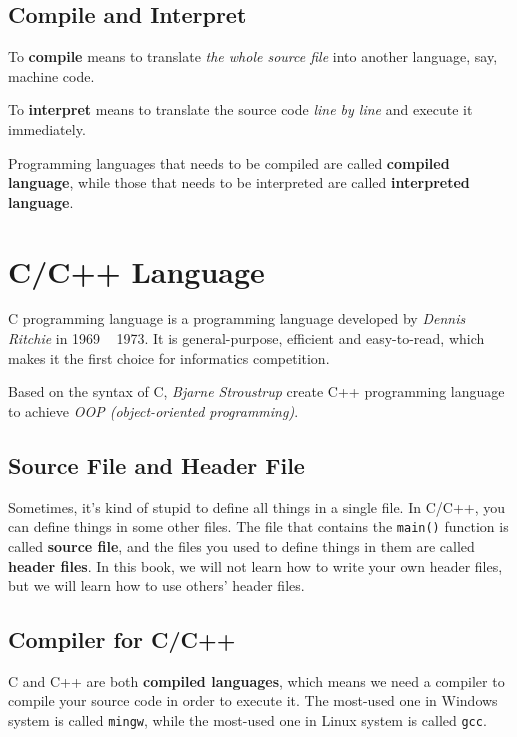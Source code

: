 \documentclass{report}
\begin{document}
\subsection{Compile and Interpret}

    To \textbf{compile} means to translate \textit{the whole source file} into another language, say, machine code.

    To \textbf{interpret} means to translate the source code \textit{line by line} and execute it immediately.

    Programming languages that needs to be compiled are called \textbf{compiled language}, while those that needs to be interpreted are called \textbf{interpreted language}.

\section{C/C++ Language}
    
    C programming language is a programming language developed by \textit{Dennis Ritchie} in 1969 ~ 1973. It is general-purpose, efficient and easy-to-read, which makes it the first choice for informatics competition.

    Based on the syntax of C, \textit{Bjarne Stroustrup} create C++ programming language to achieve \textit{OOP (object-oriented programming)}. 
    
    \subsection{Source File and Header File}

    Sometimes, it's kind of stupid to define all things in a single file. In C/C++, you can define things in some other files. The file that contains the \texttt{main()} function is called \textbf{source file}, and the files you used to define things in them are called \textbf{header files}. In this book, we will not learn how to write your own header files, but we will learn how to use others' header files.

    \subsection{Compiler for C/C++}

    C and C++ are both \textbf{compiled languages}, which means we need a compiler to compile your source code in order to execute it. The most-used one in Windows system is called \texttt{mingw}, while the most-used one in Linux system is called \texttt{gcc}.
\end{document}
